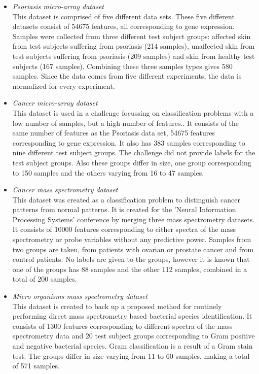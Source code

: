 \documentclass[10pt,a4paper]{article}
\begin{document}
	\begin{itemize}
		\item \textit{Psoriasis micro-array dataset} \\ This dataset is comprised of five different data sets\cite{nair2009genome, suarez2012expanding, bigler2013cross, yao2008type}. These five different datasets consist of 54675 features, all corresponding to gene expression. Samples were collected from three different test subject groups: affected skin from test subjects suffering from psoriasis (214 samples), unaffected skin from test subjects suffering from psoriasis (209 samples) and skin from healthy test subjects (167 samples). Combining these three samples types gives 580 samples. Since the data comes from five different experiments, the data is normalized for every experiment.
		\item \textit{Cancer micro-array dataset} \\ This dataset is used in a challenge focussing on classification problems with a low number of samples, but a high number of features.\cite{wojnarski2010rsctc}. It consists of the same number of features as the Psoriasis data set, 54675 features corresponding to gene expression. It also has 383 samples corresponding to nine different test subject groups. The challenge did not provide labels for the test subject groups. Also these groups differ in size, one group corresponding to 150 samples and the others varying from 16 to 47 samples.
		\item \textit{Cancer mass spectrometry dataset} \\ This dataset was created as a classification problem to distinguish cancer patterns from normal patterns\cite{NIPS2004_2728}. It is created for the 'Neural Information Processing Systems' conference by merging three mass spectrometry datasets. It consists of 10000 features corresponding to either spectra of the mass spectrometry or probe variables without any predictive power. Samples from two groups are taken, from patients with ovarian or prostate cancer and from control patients. No labels are given to the groups, however it is known that one of the groups has 88 samples and the other 112 samples, combined in a total of 200 samples.
		\item \textit{Micro organisms mass spectrometry dataset} \\ This dataset is created to back up a proposed method for routinely performing direct mass spectrometry based bacterial species identification\cite{doi:10.1093/bioinformatics/btu022}. It consists of 1300 features corresponding to different spectra of the mass spectrometry data and 20 test subject groups corresponding to Gram positive and negative bacterial species. Gram classification is a result of a Gram stain test\cite{madigan2017brock}. The groups differ in size varying from 11 to 60 samples, making a total of 571 samples.	
	\end{itemize}
\end{document}
